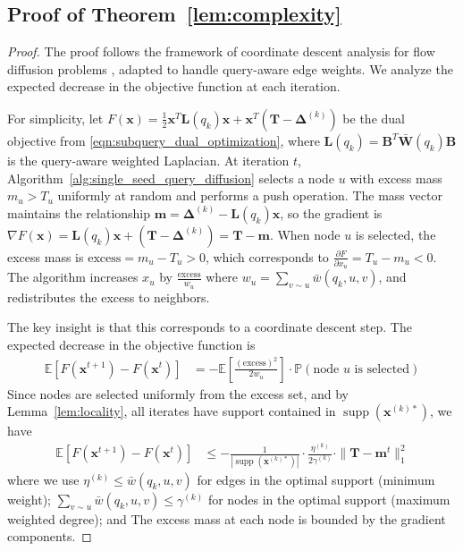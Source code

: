 \documentclass{article} %
\begin{document}
\subsection{Proof of Theorem~\ref{lem:complexity}}
\begin{proof}
The proof follows the framework of coordinate descent analysis for flow diffusion problems \citep{fountoulakis2020p}, adapted to handle query-aware edge weights. We analyze the expected decrease in the objective function at each iteration.

For simplicity, let $F(\mathbf{x}) = \frac{1}{2}\mathbf{x}^T\mathbf{L}(q_k)\mathbf{x} + \mathbf{x}^T(\mathbf{T} - \boldsymbol{\Delta}^{(k)})$ be the dual objective from \eqref{eqn:subquery_dual_optimization}, where $\mathbf{L}(q_k) = \mathbf{B}^T\bar{\mathbf{W}}(q_k)\mathbf{B}$ is the query-aware weighted Laplacian. At iteration $t$, Algorithm~\ref{alg:single_seed_query_diffusion} selects a node $u$ with excess mass $m_u > T_u$ uniformly at random and performs a push operation. The mass vector maintains the relationship $\mathbf{m} = \boldsymbol{\Delta}^{(k)} - \mathbf{L}(q_k)\mathbf{x}$, so the gradient is $\nabla F(\mathbf{x}) = \mathbf{L}(q_k)\mathbf{x} + (\mathbf{T} - \boldsymbol{\Delta}^{(k)}) = \mathbf{T} - \mathbf{m}$. When node $u$ is selected, the excess mass is $\text{excess} = m_u - T_u > 0$, which corresponds to $\frac{\partial F}{\partial x_u} = T_u - m_u < 0$. The algorithm increases $x_u$ by $\frac{\text{excess}}{w_u}$ where $w_u = \sum_{v \sim u} \bar{w}(q_k, u, v)$, and redistributes the excess to neighbors.

The key insight is that this corresponds to a coordinate descent step. The expected decrease in the objective function is
\begin{align}
\mathbb{E}[F(\mathbf{x}^{t+1}) - F(\mathbf{x}^t)] &= -\mathbb{E}\left[\frac{(\text{excess})^2}{2w_u}\right] \cdot \mathbb{P}(\text{node } u \text{ is selected})
\end{align}
Since nodes are selected uniformly from the excess set, and by Lemma~\ref{lem:locality}, all iterates have support contained in $\operatorname{supp}(\mathbf{x}^{(k)*})$, we have 
\begin{align}
\mathbb{E}[F(\mathbf{x}^{t+1}) - F(\mathbf{x}^t)] &\leq -\frac{1}{|\operatorname{supp}(\mathbf{x}^{(k)*})|} \cdot \frac{\eta^{(k)}}{2\gamma^{(k)}} \cdot \|\mathbf{T} - \mathbf{m}^t\|_1^2
\end{align}
where we use $\eta^{(k)} \leq \bar{w}(q_k, u, v)$ for edges in the optimal support (minimum weight); $\sum_{v \sim u} \bar{w}(q_k, u, v) \leq \gamma^{(k)}$ for nodes in the optimal support (maximum weighted degree); and The excess mass at each node is bounded by the gradient components.


\end{proof}
\end{document}
